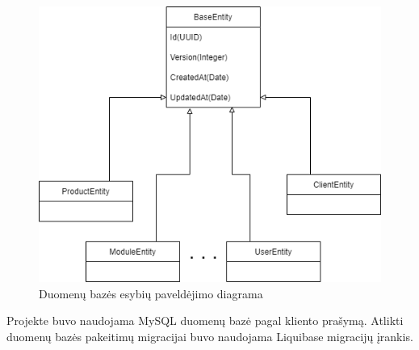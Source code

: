 \documentclass{VUMIFPSkursinis}
\begin{document}
		\begin{figure}[H]
			\includegraphics[scale=0.7]{img/eight}
			\caption{Duomenų bazės esybių paveldėjimo diagrama} %
			\label{img:kurimoProcesas}
		\end{figure}

		Projekte buvo naudojama MySQL duomenų bazė pagal kliento prašymą.
		Atlikti duomenų bazės pakeitimų migracijai buvo naudojama Liquibase migracijų įrankis.
\end{document}
